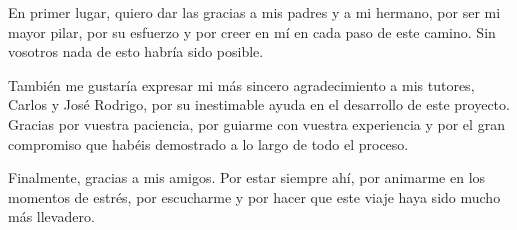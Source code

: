 \documentclass[11pt,a4paper,titlepage,oneside]{report}
\begin{document}

 
 \paxinaenbranco
 \begin{agradecementos}
  En primer lugar, quiero dar las gracias a mis padres y a mi hermano, por ser mi mayor pilar, por su esfuerzo y por creer en mí en cada paso de este camino. Sin vosotros nada de esto habría sido posible.

  También me gustaría expresar mi más sincero agradecimiento a mis tutores, Carlos y José Rodrigo, por su inestimable ayuda en el desarrollo de este proyecto. Gracias por vuestra paciencia, por guiarme con vuestra experiencia y por el gran compromiso que habéis demostrado a lo largo de todo el proceso.

  Finalmente, gracias a mis amigos. Por estar siempre ahí, por animarme en los momentos de estrés, por escucharme y por hacer que este viaje haya sido mucho más llevadero.
 \end{agradecementos}
 

 \setcounter{page}{1}

 \tableofcontents
 \listoffigures
 \listoftables
 \lstlistoflistings
 \clearpage
 
 \setcounter{page}{1}


 
 
 
 
 
 
 
 



 \appendix
 \appendixpage
 
 
 
 
%

 \printglossary[type=\acronymtype,title=\nomeglosarioacronimos]
 \printglossary[title=\nomeglosariotermos]

 
 
 \clearpage
 
\end{document}
